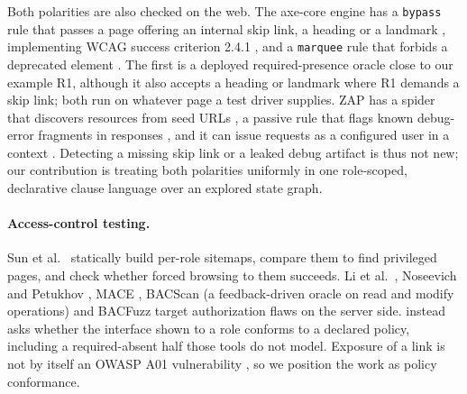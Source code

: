 Both polarities are also checked on the web. The axe-core engine
\cite{deque2024axecore} has a \texttt{bypass} rule that passes a page offering an
internal skip link, a heading or a landmark \cite{deque2024bypass}, implementing
WCAG success criterion 2.4.1 \cite{w3c2023wcag241}, and a \texttt{marquee} rule that
forbids a deprecated element \cite{deque2024marquee}. The first is a deployed
required-presence oracle close to our example R1, although it also accepts a heading
or landmark where R1 demands a skip link; both run on whatever page a test driver
supplies. ZAP
has a spider that discovers resources from seed URLs \cite{zap2025spider}, a
passive rule that flags known debug-error fragments in responses
\cite{zap2025passive}, and it can issue requests as a configured user in a
context \cite{zap2025users}. Detecting a missing skip link or a leaked debug
artifact is thus not new; our contribution is treating both polarities uniformly in
one role-scoped, declarative clause language over an explored state graph.

\paragraph{Access-control testing.}
Sun et al.\ \cite{sun2011static} statically build per-role sitemaps, compare them to
find privileged pages, and check whether forced browsing to them succeeds. Li et
al.\ \cite{li2014blackbox}, Noseevich and Petukhov \cite{noseevich2011detecting},
MACE \cite{monshizadeh2014mace}, BACScan \cite{liu2025bacscan} (a feedback-driven
oracle on read and modify operations) and BACFuzz \cite{dharmaadi2025bacfuzz} target
authorization flaws on the server side. \sys{} instead asks whether the interface
shown to a role conforms to a declared policy, including a required-absent half
those tools do not model. Exposure of a link is not by itself an OWASP A01
vulnerability \cite{owasp2021a01}, so we position the work as policy conformance.


